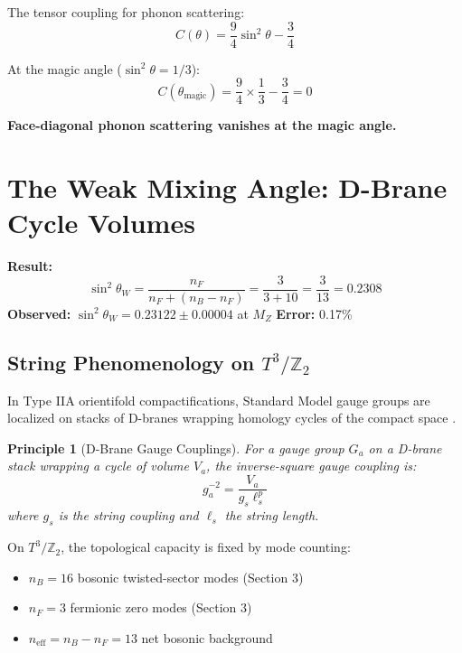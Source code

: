 \documentclass[12pt,a4paper]{article}
\newtheorem{principle}[theorem]{Principle}
\newcommand{\Ztwo}{\mathbb{Z}_2}
\newcommand{\Tthree}{T^3}
\newcommand{\sinW}{\sin^2\theta_W}
\newcommand{\nB}{n_B}
\newcommand{\nF}{n_F}
\begin{document}
The tensor coupling for phonon scattering:
\begin{equation}
C(\theta) = \frac{9}{4}\sin^2\theta - \frac{3}{4}
\end{equation}

At the magic angle ($\sin^2\theta = 1/3$):
\begin{equation}
C(\theta_{\text{magic}}) = \frac{9}{4} \times \frac{1}{3} - \frac{3}{4} = 0
\end{equation}

\textbf{Face-diagonal phonon scattering vanishes at the magic angle.}

\section{The Weak Mixing Angle: D-Brane Cycle Volumes}
\label{sec:weinberg}

\begin{derivedbox}
\textbf{Result:}
\begin{equation}
\sinW = \frac{\nF}{\nF + (\nB - \nF)} = \frac{3}{3 + 10} = \frac{3}{13} = 0.2308
\end{equation}
\textbf{Observed:} $\sinW = 0.23122 \pm 0.00004$ at $M_Z$ \quad \textbf{Error:} 0.17\%
\end{derivedbox}

\subsection{String Phenomenology on $\Tthree/\Ztwo$}

In Type IIA orientifold compactifications, Standard Model gauge groups are localized on stacks of D-branes wrapping homology cycles of the compact space \cite{Ibanez}.

\begin{principle}[D-Brane Gauge Couplings]
For a gauge group $G_a$ on a D-brane stack wrapping a cycle of volume $V_a$, the inverse-square gauge coupling is:
\begin{equation}
g_a^{-2} = \frac{V_a}{g_s \ell_s^p}
\end{equation}
where $g_s$ is the string coupling and $\ell_s$ the string length.
\end{principle}

On $\Tthree/\Ztwo$, the topological capacity is fixed by mode counting:
\begin{itemize}
    \item $\nB = 16$ bosonic twisted-sector modes (Section 3)
    \item $\nF = 3$ fermionic zero modes (Section 3)
    \item $n_{\text{eff}} = \nB - \nF = 13$ net bosonic background
\end{itemize}
\end{document}
